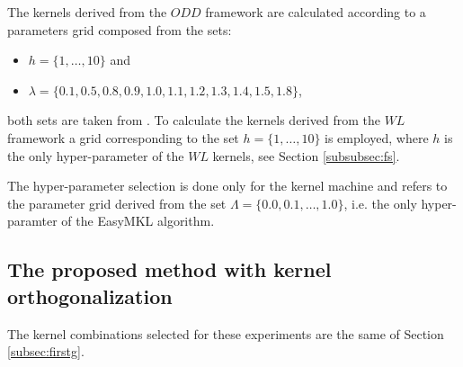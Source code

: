 The kernels derived from the $ODD$ framework are calculated according to a parameters grid
composed from the sets:
\begin{itemize}
    \item $h=\{1,\dots,10\}$ and 
    \item $\lambda=\{0.1, 0.5, 0.8, 0.9, 1.0, 1.1, 1.2, 1.3, 1.4, 1.5, 1.8\}$,
\end{itemize}
both sets are taken from \cite{rtesselli}.
To calculate the kernels derived from the $WL$ framework a grid corresponding to
the set $h=\{1,\dots,10\}$ is employed, where $h$ is the only hyper-parameter of
the $WL$ kernels, see Section \ref{subsubsec:fs}.

The hyper-parameter selection is done only for the kernel machine and refers
to the parameter grid derived from the set $\Lambda=\{0.0, 0.1,\dots,1.0\}$, i.e. the
only hyper-paramter of the EasyMKL algorithm.

\subsection{The proposed method with kernel orthogonalization}
\label{subsec:secondg}

The kernel combinations selected for these experiments are the same of Section \ref{subsec:firstg}.


